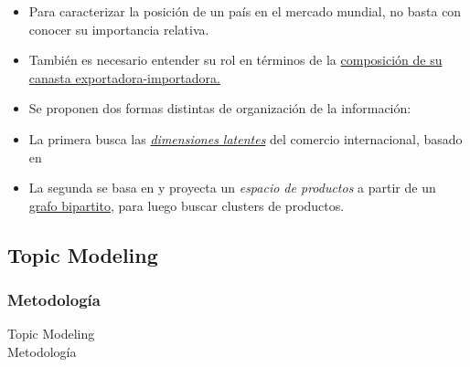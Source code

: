 \documentclass[compress]{beamer}
\begin{document}
\begin{frame}
\begin{itemize}[label=\faRebel]
\item Para caracterizar la posición de un país en el mercado mundial, no basta con conocer su importancia relativa.
\item También es necesario entender su rol en términos de la \underline{composición de su canasta exportadora-importadora.}

\end{itemize}
\end{frame}


\begin{frame}

\begin{itemize}[label=\faRebel]
\item Se proponen dos formas distintas de organización de la información:
\item La primera busca las \underline{\textit{dimensiones latentes}} del comercio internacional, basado en \citep{blei2003latent}
\item La segunda se basa en \cite{Hidalgo2007,Hidalgo2009} y proyecta un \textit{espacio de productos} a partir de un \underline{grafo bipartito}, para luego buscar clusters de productos.

\end{itemize}
\end{frame}

\subsection{Topic Modeling}
\subsubsection{Metodología}

\begin{frame}
\centering
\Large Topic Modeling \\

\normalsize Metodología
\end{frame}
\end{document}
